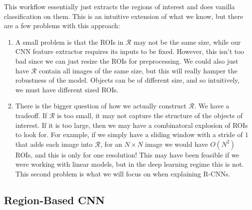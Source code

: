 \documentclass{article}
\begin{document}
  This workflow essentially just extracts the regions of interest and does vanilla classification on them. This is an intuitive extension of what we know, but there are a few problems with this approach: 
  \begin{enumerate}
    \item A small problem is that the ROIs in $\mathcal{R}$ may not be the same size, while our CNN feature extractor requires its inputs to be fixed. However, this isn't too bad since we can just resize the ROIs for preprocessing. We could also just have $\mathcal{R}$ contain all images of the same size, but this will really hamper the robustness of the model. Objects can be of different size, and so intuitively, we must have different sized ROIs. 

    \item There is the bigger question of how we actually construct $\mathcal{R}$. We have a tradeoff. If $\mathcal{R}$ is too small, it may not capture the structure of the objects of interest. If it is too large, then we may have a combinatoral explosion of ROIs to look for. For example, if we simply have a sliding window with a stride of $1$ that adds each image into $\mathcal{R}$, for an $N \times N$ image we would have $O(N^2)$ ROIs, and this is only for one resolution! This may have been feasible if we were working with linear models, but in the deep learning regime this is not. This second problem is what we will focus on when explaining R-CNNs. 
    
      \begin{center}
      \end{center}
  \end{enumerate}

  \subsection{Region-Based CNN}
\end{document}
